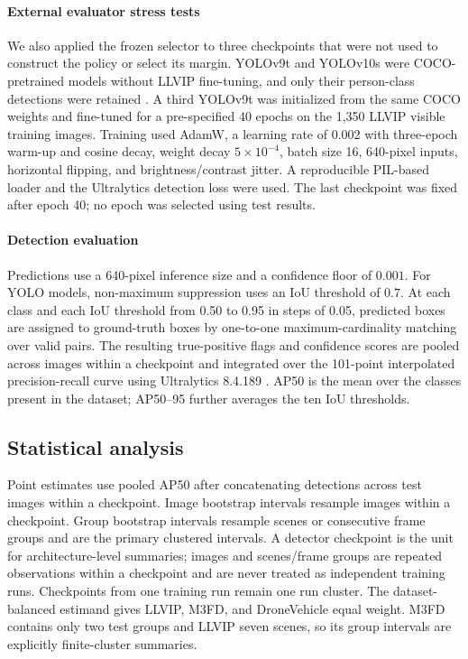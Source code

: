 \documentclass[preprint,11pt]{elsarticle}
\begin{document}
\paragraph{External evaluator stress tests}
We also applied the frozen selector to three checkpoints that were not used to
construct the policy or select its margin. YOLOv9t and YOLOv10s were
COCO-pretrained models without LLVIP fine-tuning, and only their person-class
detections were retained \cite{wang2024yolov9,wang2024yolov10}. A third
YOLOv9t was initialized from the same COCO weights and fine-tuned for a
pre-specified 40 epochs on the 1,350 LLVIP visible training images. Training
used AdamW, a learning rate of 0.002 with three-epoch warm-up and cosine decay,
weight decay \(5\times10^{-4}\), batch size 16, 640-pixel inputs, horizontal
flipping, and brightness/contrast jitter. A reproducible PIL-based loader and
the Ultralytics detection loss were used. The last checkpoint was fixed after
epoch 40; no epoch was selected using test results.

\paragraph{Detection evaluation}
Predictions use a 640-pixel inference size and a confidence floor of
\(0.001\). For YOLO models, non-maximum suppression uses an IoU threshold of
\(0.7\). At each class and each IoU threshold from 0.50 to 0.95 in steps of
0.05, predicted boxes are assigned to ground-truth boxes by one-to-one
maximum-cardinality matching over valid pairs. The resulting true-positive
flags and confidence scores are pooled across images within a checkpoint and
integrated over the 101-point interpolated precision-recall curve using
Ultralytics 8.4.189 \cite{jocher2026ultralytics}. AP50 is the mean over the
classes present in the dataset; AP50--95 further averages the ten IoU
thresholds.

\subsection{Statistical analysis}

Point estimates use pooled AP50 after concatenating detections across test
images within a checkpoint. Image bootstrap intervals resample images within a
checkpoint. Group bootstrap intervals resample scenes or consecutive frame
groups and are the primary clustered intervals. A detector checkpoint is the
unit for architecture-level summaries; images and scenes/frame groups are
repeated observations within a checkpoint and are never treated as independent
training runs. Checkpoints from one training run remain one run cluster.
The dataset-balanced estimand gives LLVIP, M3FD, and DroneVehicle equal weight.
M3FD contains only two test groups and LLVIP seven scenes, so its group
intervals are explicitly finite-cluster summaries.
\end{document}
